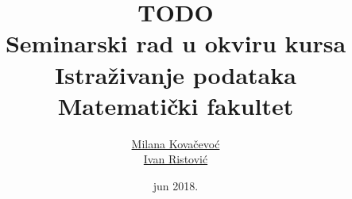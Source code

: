 \documentclass[a4paper]{article}
\begin{document}
\title{TODO\\ \small{Seminarski rad u okviru kursa\\Istra\v{z}ivanje podataka\\ Matematički fakultet}}

\author{\href{mailto:mi14031@matf.bg.ac.rs}{Milana Kova\v{c}evo\'c}\\\href{mailto:mi14042@matf.bg.ac.rs}{Ivan Ristovi\'c}}
\date{jun 2018.}

\maketitle

\tableofcontents

\newpage






\appendix



\appendix

\end{document}
